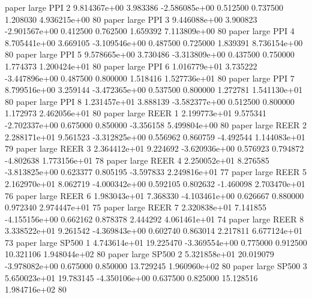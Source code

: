               paper      large      PPI                 2 9.814367e+00      3.983386 -2.586085e+00 0.512500 0.737500       1.208030 4.936215e+00 80
              paper      large      PPI                 3 9.446088e+00      3.900823 -2.901567e+00 0.412500 0.762500       1.659392 7.113809e+00 80
              paper      large      PPI                 4 8.705441e+00      3.669105 -3.109546e+00 0.487500 0.725000       1.839391 8.736154e+00 80
              paper      large      PPI                 5 9.578665e+00      3.730486 -3.313809e+00 0.437500 0.750000       1.774373 1.200424e+01 80
              paper      large      PPI                 6 1.016779e+01      3.735222 -3.447896e+00 0.487500 0.800000       1.518416 1.527736e+01 80
              paper      large      PPI                 7 8.799516e+00      3.259144 -3.472365e+00 0.537500 0.800000       1.272781 1.541130e+01 80
              paper      large      PPI                 8 1.231457e+01      3.888139 -3.582377e+00 0.512500 0.800000       1.172973 2.462056e+01 80
              paper      large     REER                 1 2.199773e+01      9.575341 -2.702337e+00 0.675000 0.850000      -3.356158 5.499804e+00 80
              paper      large     REER                 2 2.288171e+01      9.561523 -3.312825e+00 0.556962 0.860759      -4.492544 1.144083e+01 79
              paper      large     REER                 3 2.364412e+01      9.224692 -3.620936e+00 0.576923 0.794872      -4.802638 1.773156e+01 78
              paper      large     REER                 4 2.250052e+01      8.276585 -3.813825e+00 0.623377 0.805195      -3.597833 2.249816e+01 77
              paper      large     REER                 5 2.162970e+01      8.062719 -4.000342e+00 0.592105 0.802632      -1.460098 2.703470e+01 76
              paper      large     REER                 6 1.983043e+01      7.368330 -4.103461e+00 0.626667 0.880000       0.972340 2.974447e+01 75
              paper      large     REER                 7 2.320838e+01      7.141855 -4.155156e+00 0.662162 0.878378       2.444292 4.061461e+01 74
              paper      large     REER                 8 3.338522e+01      9.261542 -4.369843e+00 0.602740 0.863014       2.217811 6.677124e+01 73
              paper      large    SP500                 1 4.743614e+01     19.225470 -3.369554e+00 0.775000 0.912500      10.321106 1.948044e+02 80
              paper      large    SP500                 2 5.321858e+01     20.019079 -3.978082e+00 0.675000 0.850000      13.729245 1.960960e+02 80
              paper      large    SP500                 3 5.650023e+01     19.783145 -4.350106e+00 0.637500 0.825000      15.128516 1.984716e+02 80

